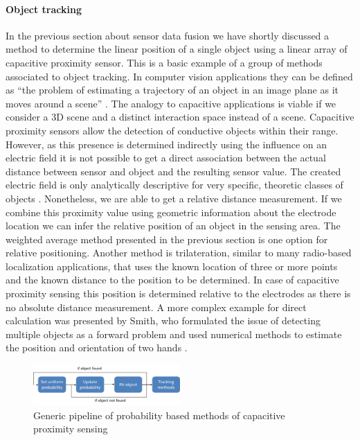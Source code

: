 \paragraph{Object tracking}
In the previous section about sensor data fusion we have shortly discussed a method to determine the linear position of a single object using a linear array of capacitive proximity sensor. This is a basic example of a group of methods associated to object tracking. In computer vision applications they can be defined as “the problem of estimating a trajectory of an object in an image plane as it moves around a scene” \cite{yilmaz2006object}. The analogy to capacitive applications is viable if we consider a 3D scene and a distinct interaction space instead of a scene. 
Capacitive proximity sensors allow the detection of conductive objects within their range. However, as this presence is determined indirectly using the influence on an electric field it is not possible to get a direct association between the actual distance between sensor and object and the resulting sensor value. The created electric field is only analytically descriptive for very specific, theoretic classes of objects \cite{Baxter1996}. Nonetheless, we are able to get a relative distance measurement. If we combine this proximity value using geometric information about the electrode location we can infer the relative position of an object in the sensing area. The weighted average method presented in the previous section is one option for relative positioning. Another method is trilateration, similar to many radio-based localization applications, that uses the known location of three or more points and the known distance to the position to be determined. In case of capacitive proximity sensing this position is determined relative to the electrodes as there is no absolute distance measurement. 
A more complex example for direct calculation was presented by Smith, who formulated the issue of detecting multiple objects as a forward problem and used numerical methods to estimate the position and orientation of two hands \cite{Smith1999a}.
\begin{figure}[h]
\centering
\includegraphics[width=0.5\textwidth]{images/prob_methods}
\caption{Generic pipeline of probability based methods of capacitive proximity sensing}
\label{fig:rel_prob_method}
\end{figure}
